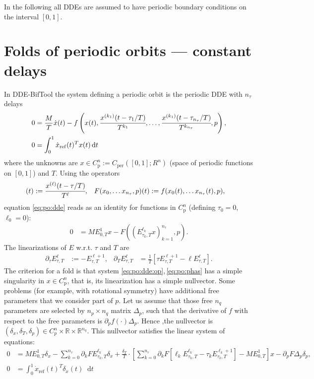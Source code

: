 \documentclass[11pt]{scrartcl}
\renewcommand{\d}{\mathop{}\!\mathrm{d}}
\newcommand{\R}{\mathbb{R}}
\begin{document}
In the following all DDEs are assumed to have periodic boundary
conditions on the interval $[0,1]$.

\section{Folds of periodic orbits --- constant delays}
\label{sec:ext:fold}
In DDE-BifTool the system defining a periodic orbit is the periodic
DDE with $n_\tau$ delays
\begin{align}
  \label{eq:po:dde}
  0&=\frac{M}{T}\dot x(t)-f\left(x(t),\cfrac{x^{(k_1)}(t-\tau_1/T)}{T^{k_1}},\ldots,\cfrac{x^{(k_1)}(t-\tau_{n_\tau}/T)}{T^{k_{n_\tau}}},p\right)\mbox{,}\\
  \label{eq:po:phas}
  0&=\int_0^1\dot x_\mathrm{ref}(t)^Tx(t)\d t
\end{align}
where the unknowns are $x\in C_\mathrm{p}^n:=C_\mathrm{per}([0,1];R^n)$ (space
of periodic functions on $[0,1]$) and $T$. Using the operators
\begin{align*}
  [E^\ell_{\tau,T}x](t)&:=\cfrac{x^{(\ell)}(t-\tau/T)}{T^\ell},&
  F(x_0,\ldots x_{n_\tau},p)(t)&:=f(x_0(t),\ldots x_{n_\tau}(t),p),
\end{align*}
equation \eqref{eq:po:dde} reads as an identity for functions in $C^n_\mathrm{p}$ (defining $\tau_0=0$, $\ell_0=0$):
\begin{align}
  \label{eq:po:dde:op}
  0&=ME^1_{0,T}x-F\left(\left(E^{\ell_k}_{\tau_k,T}x\right)_{k=1}^{n_\tau},p\right)\mbox{.}
\end{align}
The linearizations of $E$ w.r.t. $\tau$ and $T$ are
\begin{align*}
  \partial_\tau E^\ell_{\tau,T}&:=-E^{\ell+1}_{\tau,T},&
  \partial_T E^\ell_{\tau,T}&=\frac{1}{T}\left[\tau E^{\ell+1}_{\tau,T}-\ell E^\ell_{\tau,T}\right]\mbox{.}
\end{align*}
The criterion for a fold is that system
\eqref{eq:po:dde:op},\,\eqref{eq:po:phas} has a simple singularity in
$x\in C^n_\mathrm{p}$, that is, its linearization has a simple
nullvector. Some problems (for example, with rotational symmetry) have
additional free parameters that we consider part of $p$. Let us assume
that those free $n_q$ parameters are selected by $n_p\times n_q$
matrix $\Delta_p$, such that the derivative of $f$ with respect to the
free parameters is $\partial_pf(\cdot)\Delta_p$. Hence ,the nullvector
is $(\delta_x,\delta_T,\delta_p)\in C_p^n\times\R\times\R^{n_q}$. This nullvector
satisfies the linear system of equations:
\begin{align}
  \label{eq:fold:dde+dt}
  0&=ME^1_{0,T}\delta_x-\sum_{k=0}^{n_\tau}\partial_kFE^{\ell_k}_{\tau_k,T}\delta_x+
  \frac{\delta_T}{T}\cdot\left[
    \sum_{k=0}^{n_\tau}\partial_{k}F \left[\ell_kE^{\ell_k}_{\tau_k,T}-\tau_kE^{\ell_k+1}_{\tau_k,T}\right]-ME^1_{0,T}\right]x-\partial_pF\Delta_p\delta_p\mbox{,}\\
  \label{eq:fold:phas0}
  0&=\int_0^1\dot x_\mathrm{ref}(t)^T\delta_x(t)\d t
\end{align}
\end{document}

